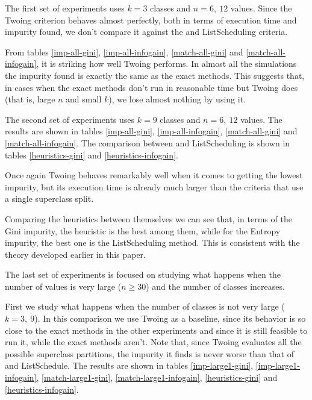 The first set of experiments uses $k=3$ classes and $n=6,~12$ values. Since the Twoing criterion behaves almost perfectly, both in terms of execution time and impurity found, we don't compare it against the \Alg and ListScheduling criteria.

From tables \ref{imp-all-gini}, \ref{imp-all-infogain}, \ref{match-all-gini} and \ref{match-all-infogain}, it is striking how well Twoing performs. In almost all the simulations the impurity found is exactly the same as the exact methods. This suggests that, in cases when the exact methods don't run in reasonable time but Twoing does (that is, large $n$ and small $k$), we lose almost nothing by using it.



The second set of experiments uses $k=9$ classes and $n=6,~12$ values. The results are shown in tables \ref{imp-all-gini}, \ref{imp-all-infogain}, \ref{match-all-gini} and \ref{match-all-infogain}. The comparison between \Alg and ListScheduling is shown in tables \ref{heuristics-gini} and \ref{heuristics-infogain}.


Once again Twoing behaves remarkably well when it comes to getting the lowest impurity, but its execution time is already much larger than the criteria that use a single superclass split.


Comparing the heuristics between themselves we can see that, in terms of the Gini impurity, the \Alg heuristic is the best among them, while for the Entropy impurity, the best one is the ListScheduling method. This is consistent with the theory developed earlier in this paper.



The last set of experiments is focused on studying what happens when the number of values is very large ($n\ge30$) and the number of classes increases. 

First we study what happens when the number of classes is not very large ($k=3, ~9$). In this comparison we use Twoing as a baseline, since its behavior is so close to the exact methods in the other experiments and since it is still feasible to run it, while the exact methods aren't. Note that, since Twoing evaluates all the possible superclass partitions, the impurity it finds is never worse than that of \Alg and ListSchedule. The results are shown in tables \ref{imp-large1-gini}, \ref{imp-large1-infogain}, \ref{match-large1-gini}, \ref{match-large1-infogain}, \ref{heuristics-gini} and \ref{heuristics-infogain}.



